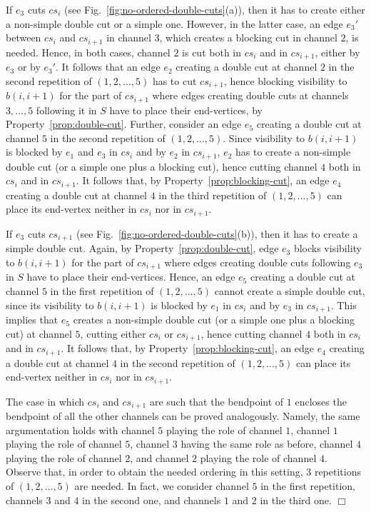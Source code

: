 \documentclass[a4paper,10pt]{llncs}
\newcounter{prop}
\renewenvironment{proof}
{{\bf Proof:}}{\hspace*{\fill}$\Box$\par\vspace{2mm}}
\begin{document}
\begin{proof}
If $e_3$ cuts $cs_i$ (see Fig.~\ref{fig:no-ordered-double-cuts}(a)), then it has to create either a non-simple double cut or a simple one. However, in the latter case, an edge $e_3'$ between $cs_i$ and $cs_{i+1}$ in channel $3$, which creates a blocking cut in channel $2$, is needed. Hence, in both cases, channel $2$ is cut both in $cs_i$ and in $cs_{i+1}$, either by $e_3$ or by $e_3'$. It follows that an edge $e_2$ creating a double cut at channel $2$ in the second repetition of $(1,2,\ldots ,5)$ has to cut $cs_{i+1}$, hence blocking visibility to $b(i,i+1)$ for the part of $cs_{i+1}$ where edges creating double cuts at channels $3,\dots,5$ following it in $S$ have to place their end-vertices, by Property~\ref{prop:double-cut}. Further, consider an edge $e_5$ creating a double cut at channel $5$ in the second repetition of $(1,2,\ldots ,5)$. Since visibility to $b(i,i+1)$ is blocked by $e_1$ and $e_3$ in $cs_i$ and by $e_2$ in $cs_{i+1}$, $e_2$ has to create a non-simple double cut (or a simple one plus a blocking cut), hence cutting channel $4$ both in $cs_i$ and in $cs_{i+1}$. It follows that, by Property~\ref{prop:blocking-cut}, an edge $e_4$ creating a double cut at channel $4$ in the third repetition of $(1,2,\ldots ,5)$ can place its end-vertex neither in $cs_i$ nor in $cs_{i+1}$.

If $e_3$ cuts $cs_{i+1}$ (see Fig.~\ref{fig:no-ordered-double-cuts}(b)), then it has to create a simple double cut. Again, by Property~\ref{prop:double-cut}, edge $e_3$ blocks visibility to $b(i,i+1)$ for the part of $cs_{i+1}$ where edges creating double cuts following $e_3$ in $S$ have to place their end-vertices. Hence, an edge $e_5$ creating a double cut at channel $5$ in the first repetition of $(1,2,\ldots ,5)$ cannot create a simple double cut, since its visibility to $b(i,i+1)$ is blocked by $e_1$ in $cs_i$ and by $e_3$ in $cs_{i+1}$. This implies that $e_5$ creates a non-simple double cut (or a simple one plus a blocking cut) at channel $5$, cutting either $cs_i$ or $cs_{i+1}$, hence cutting channel $4$ both in $cs_i$ and in $cs_{i+1}$. It follows that, by Property~\ref{prop:blocking-cut}, an edge $e_4$ creating a double cut at channel $4$ in the second repetition of $(1,2,\ldots ,5)$ can place its end-vertex neither in $cs_i$ nor in $cs_{i+1}$.

The case in which $cs_i$ and $cs_{i+1}$ are such that the bendpoint of $1$ encloses the bendpoint of all the other channels can be proved analogously. Namely, the same argumentation holds with channel $5$ playing the role of channel $1$, channel $1$ playing the role of channel $5$, channel $3$ having the same role as before, channel $4$ playing the role of channel $2$, and channel $2$ playing the role of channel $4$. Observe that, in order to obtain the needed ordering in this setting, $3$ repetitions of $(1,2,\ldots ,5)$ are needed. In fact, we consider channel $5$ in the first repetition, channels $3$ and $4$ in the second one, and channels $1$ and $2$ in the third one.
\end{proof}
\end{document}
